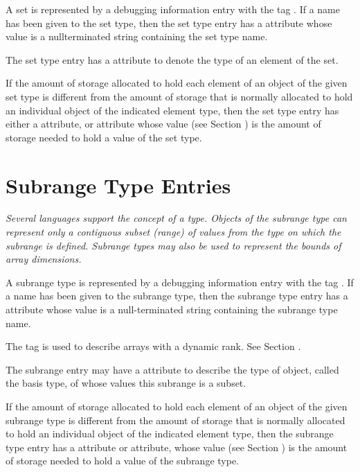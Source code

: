A set is represented by a debugging information entry with
the tag \DWTAGsettypeTARG. 
If a name has been given to the
set type, then the set type entry has 
a \DWATname{} attribute
whose value is a null\dash terminated string containing the
set type name.
\bbeb

The set type entry has a
\DWATtype{} attribute to denote the
type of an element of the set.

If the amount of storage allocated to hold each element of an
object of the given set type is different from the amount of
storage that is normally allocated to hold an individual object
of the indicated element type, then the set type entry has
either a \DWATbytesize{} attribute, or 
\DWATbitsize{} attribute
whose value (see Section ) is
the amount of storage needed to hold a value of the set type.

\section{Subrange Type Entries}
\label{chap:subrangetypeentries}

\textit{Several languages support the concept of a 
type. Objects of the subrange type can represent only a contiguous 
subset (range) of values from the type on which the subrange is defined.
Subrange types may also be used to represent the bounds of array dimensions.}

A subrange type is represented by a debugging information
entry with the tag 
\DWTAGsubrangetypeTARG. 
If a name has been given to the subrange type, then the 
subrange type entry has a 
\DWATname{} attribute
whose value is a null-terminated
string containing the subrange type name.
\bbeb

The tag \DWTAGgenericsubrange{}
is used to describe arrays with a dynamic rank. See Section
.

The subrange entry may have a 
\DWATtype{} attribute to describe
the type of object, called the basis type, of whose values
this subrange is a subset.

If the amount of storage allocated to hold each element of an
object of the given subrange type is different from the amount
of storage that is normally allocated to hold an individual
object of the indicated element type, then the subrange
type entry has a 
\DWATbytesize{} attribute or 
\DWATbitsize{}
attribute, whose value 
(see Section )
is the amount of storage needed to hold a value of the subrange type.


